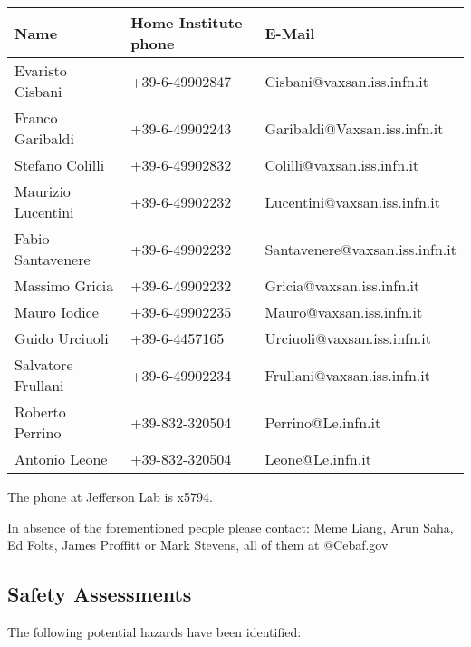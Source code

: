 \begin{center}
\begin{tabular}{l l l}
Name & Home Institute phone & E-Mail \\
\hline
Evaristo Cisbani & +39-6-49902847& Cisbani@vaxsan.iss.infn.it\\
Franco Garibaldi & +39-6-49902243& Garibaldi@Vaxsan.iss.infn.it\\
Stefano Colilli & +39-6-49902832 &Colilli@vaxsan.iss.infn.it\\
Maurizio Lucentini& +39-6-49902232 &Lucentini@vaxsan.iss.infn.it\\
Fabio Santavenere & +39-6-49902232& Santavenere@vaxsan.iss.infn.it\\
Massimo Gricia & +39-6-49902232 &Gricia@vaxsan.iss.infn.it\\
Mauro Iodice & +39-6-49902235 &Mauro@vaxsan.iss.infn.it\\
Guido Urciuoli & +39-6-4457165 &Urciuoli@vaxsan.iss.infn.it\\
Salvatore Frullani & +39-6-49902234 &Frullani@vaxsan.iss.infn.it\\
Roberto Perrino & +39-832-320504 &Perrino@Le.infn.it\\
Antonio Leone & +39-832-320504 & Leone@Le.infn.it\\
\hline
\end{tabular}
\end{center}

The phone at Jefferson Lab is x5794.

In absence of the forementioned people please contact:
Meme Liang, Arun Saha, Ed Folts, James Proffitt or Mark Stevens, all of them at @Cebaf.gov

\subsection{Safety Assessments}
	
The following potential hazards have been identified: 


